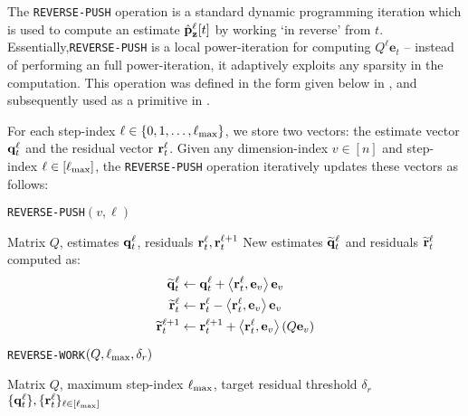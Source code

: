 The \texttt{REVERSE-PUSH} operation is a standard dynamic programming iteration which is used to compute an estimate $\hat{\mathbf{p}}_\mathbf{z}^{\ell}[t]$ by working `in reverse' from $t$. 
Essentially,\texttt{REVERSE-PUSH} is a local power-iteration for computing $Q^{\ell}\mathbf{e}_t$ -- instead of performing an full power-iteration, it adaptively exploits any sparsity in the computation.
This operation was defined in the form given below in \cite{andersen2007local}, and subsequently used as a primitive in \cite{banerjee2015fast, lee2014asynchronous}.

For each step-index $\ell\in\{0,1,\ldots,\ell_{\max}\}$, we store two vectors: the estimate vector $\mathbf{q}^{\ell}_t$ and the residual vector $\mathbf{r}^{\ell}_t$.
Given any dimension-index $v\in[n]$ and step-index $\ell\in[\ell_{\max}]$, the \texttt{REVERSE-PUSH} operation iteratively updates these vectors as follows:
\begin{algorithm}[!ht]
\caption{\texttt{REVERSE-PUSH}$(v,\ell)$}
\label{alg:push}
\begin{algorithmic}[1]
\REQUIRE Matrix $Q$, estimates $\mathbf{q}^{\ell}_t$, residuals $\mathbf{r}^{\ell}_t,\mathbf{r}^{\ell+1}_t$
\RETURN New estimates $\widetilde{\mathbf{q}}^{\ell}_t$ and residuals $\widetilde{\mathbf{r}}^{\ell}_t$ computed as:
\begin{align*}
	\widetilde{\mathbf{q}}^{\ell}_t &\leftarrow \mathbf{q}^{\ell}_t + \left< \mathbf{r}^{\ell}_t, \mathbf{e}_v \right>\mathbf{e}_v \\
	\widetilde{\mathbf{r}}^{\ell}_t &\leftarrow \mathbf{r}^{\ell}_t - \left< \mathbf{r}^{\ell}_t, \mathbf{e}_v \right>\mathbf{e}_v \\
	\widetilde{\mathbf{r}}^{\ell+1}_t &\leftarrow \mathbf{r}^{\ell+1}_t + \left< \mathbf{r}^{\ell}_t, \mathbf{e}_v \right>(Q\mathbf{e}_v)
\end{align*}	
\end{algorithmic}
\end{algorithm}    



\begin{algorithm}[ht]
\caption{\texttt{REVERSE-WORK}$(Q, \ell_{\max}, \delta_r)$}
\label{alg:rwork}
\begin{algorithmic}[1]
\REQUIRE Matrix $Q$, maximum step-index $\ell_{\max}$, target residual threshold $\delta_r$
\ENDWHILE
\ENDFOR
\RETURN $\{\mathbf{q}^{\ell}_t\}, \{\mathbf{r}^{\ell}_t\}_{\ell\in[\ell_{\max}]}$
\end{algorithmic}
\end{algorithm}    

